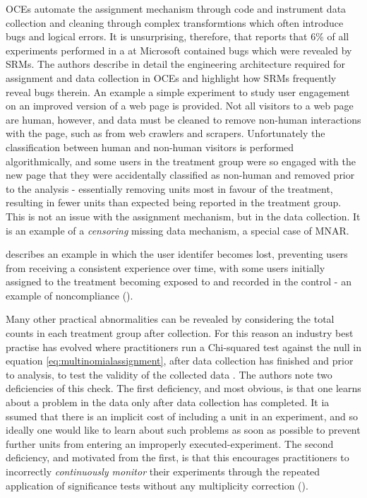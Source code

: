 \documentclass[11pt]{article}
\begin{document}
OCEs automate the assignment mechanism through code and instrument data collection and cleaning through complex transformtions which often introduce bugs and logical errors. It is unsurprising, therefore, that \cite{fabijan} reports that 6\% of all experiments performed in a at Microsoft contained bugs which were revealed by SRMs. The authors describe in detail the engineering architecture required for assignment and data collection in OCEs and highlight how SRMs frequently reveal bugs therein. An example a simple experiment to study user engagement on an improved version of a web page is provided. Not all visitors to a web page are human, however, and data must be cleaned to remove non-human interactions with the page, such as from web crawlers and scrapers. Unfortunately the classification between human and non-human visitors is performed algorithmically, and some users in the treatment group were so engaged with the new page that they were accidentally classified as non-human and removed prior to the analysis - essentially removing units most in favour of the treatment, resulting in fewer units than expected being reported in the treatment group. This is not an issue with the assignment mechanism, but in the data collection. It is an example of a \textit{censoring} missing data mechanism, a special case of MNAR.

\cite{zhao} describes an example in which the user identifer becomes lost, preventing users from receiving a consistent experience over time, with some users initially assigned to the treatment becoming exposed to and recorded in the control - an example of noncompliance (\cite{imbens}). 

Many other practical abnormalities can be revealed by considering the total counts in each treatment group after collection. For this reason an industry best practise has evolved where practitioners run a Chi-squared test against the null in equation \eqref{eq:multinomialassignment}, after data collection has finished and prior to analysis, to test the validity of the collected data \cite{linkedin}.
The authors note two deficiencies of this check. The first deficiency, and most obvious, is that one learns about a problem in the data only after data collection has completed. It ia ssumed that there is an implicit cost of including a unit in an experiment, and so ideally one would like to learn about such problems as soon as possible to prevent further units from entering an improperly executed-experiment. The second deficiency, and motivated from the first, is that this encourages practitioners to incorrectly \textit{continuously monitor} their experiments through the repeated application of significance tests without any multiplicity correction (\cite{armitage}).
\end{document}
